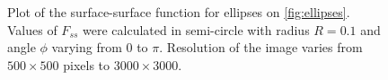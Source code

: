 \documentclass[reprint,amsmath,amssymb,aps,pre,showkeys,showpacs]{revtex4-1}
\begin{document}
\begin{figure}[!pt]
  \centering
  \hfill
  \caption[]{Plot of the surface-surface function for ellipses on
    \cref{fig:ellipses}. Values of $F_{ss}$ were calculated in semi-circle with
    radius $R = 0.1$ and angle $\phi$ varying from $0$ to $\pi$. Resolution of
    the image varies from $500\times 500$ pixels to $3000\times 3000$.}
  \label{fig:fss-ellipses}
\end{figure}
\end{document}
